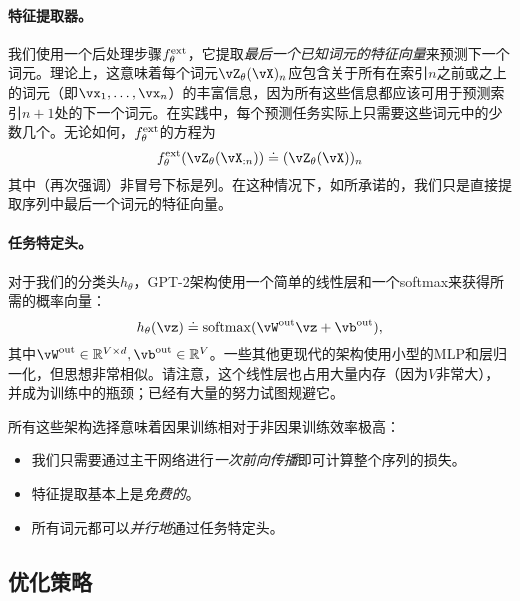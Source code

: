 \documentclass[../../book-main_zh.tex]{subfiles}
\begin{document}
\paragraph{特征提取器。} 我们使用一个后处理步骤\(f_{\theta}^{\mathrm{ext}}\)，它提取\textit{最后一个已知词元的特征向量}来预测下一个词元。理论上，这意味着每个词元\(\vZ_{\theta}(\vX)_{n}\)应包含关于所有在索引\(n\)之前或之上的词元（即\(\vx_{1}, \dots, \vx_{n}\)）的丰富信息，因为所有这些信息都应该可用于预测索引\(n + 1\)处的下一个词元。在实践中，每个预测任务实际上只需要这些词元中的少数几个。无论如何，\(f_{\theta}^{\mathrm{ext}}\)的方程为
\begin{equation}
    f_{\theta}^{\ext}(\vZ_{\theta}(\vX_{:n})) \doteq (\vZ_{\theta}(\vX))_{n}
\end{equation}
其中（再次强调）非冒号下标是列。在这种情况下，如所承诺的，我们只是直接提取序列中最后一个词元的特征向量。

\paragraph{任务特定头。} 对于我们的分类头\(h_{\theta}\)，GPT-2架构使用一个简单的线性层和一个softmax来获得所需的概率向量：
\begin{equation}
    h_{\theta}(\vz) \doteq \softmax(\vW^{\out}\vz + \vb^{\out}),
\end{equation}
其中\(\vW^{\out} \in \R^{V \times d}, \vb^{\out} \in \R^{V}\)。一些其他更现代的架构使用小型的MLP和层归一化，但思想非常相似。请注意，这个线性层也占用大量内存（因为\(V\)非常大），并成为训练中的瓶颈；已经有大量的努力试图规避它。

所有这些架构选择意味着因果训练相对于非因果训练效率极高：
\begin{itemize}
    \item 我们只需要通过主干网络进行\textit{一次前向传播}即可计算整个序列的损失。
    \item 特征提取基本上是\textit{免费的}。
    \item 所有词元都可以\textit{并行地}通过任务特定头。
\end{itemize}

\subsection{优化策略}
\end{document}
